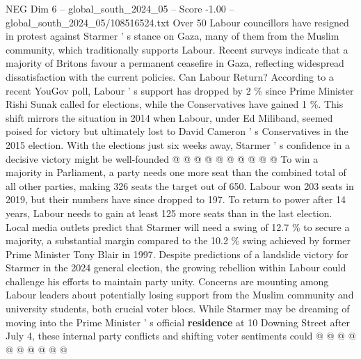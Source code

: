 \begin{textsample}{NEG Dim 6 – global\_south\_2024\_05 – Score -1.00 – global\_south\_2024\_05/108516524.txt}
Over 50 Labour councillors have resigned in protest against Starmer ' s stance on Gaza, many of them from the Muslim community, which traditionally supports Labour.
Recent surveys indicate that a majority of Britons favour a permanent ceasefire in Gaza, reflecting widespread dissatisfaction with the current policies.
Can Labour Return?
According to a recent YouGov poll, Labour ' s support has dropped by 2 \% since Prime Minister Rishi Sunak called for elections, while the Conservatives have gained 1 \%.
This shift mirrors the situation in 2014 when Labour, under Ed Miliband, seemed poised for victory but ultimately lost to David Cameron ' s Conservatives in the 2015 election.
With the elections just six weeks away, Starmer ' s confidence in a decisive victory might be well-founded @ @ @ @ @ @ @ @ @ @ To win a majority in Parliament, a party needs one more seat than the combined total of all other parties, making 326 seats the target out of 650.
Labour won 203 seats in 2019, but their numbers have since dropped to 197.
To return to power after 14 years, Labour needs to gain at least 125 more seats than in the last election.
Local media outlets predict that Starmer will need a swing of 12.7 \% to secure a majority, a substantial margin compared to the 10.2 \% swing achieved by former Prime Minister Tony Blair in 1997.
Despite predictions of a landslide victory for Starmer in the 2024 general election, the growing rebellion within Labour could challenge his efforts to maintain party unity.
Concerns are mounting among Labour leaders about potentially losing support from the Muslim community and university students, both crucial voter blocs.
While Starmer may be dreaming of moving into the Prime Minister ' s official \textbf{residence} at 10 Downing Street after July 4, these internal party conflicts and shifting voter sentiments could @ @ @ @ @ @ @ @ @ @

\end{textsample}
